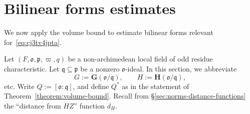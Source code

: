 \documentclass[reqno]{amsart}
\theoremstyle{plain} \newtheorem{theorem} {Theorem} \newtheorem{conjecture} {Conjecture} \newtheorem{corollary} [theorem] {Corollary} \newtheorem{proposition} [theorem] {Proposition} \newtheorem{fact} [theorem] {Fact}
\theoremstyle{definition} \newtheorem{definition} [theorem] {Definition}
\theoremstyle{itplain} %
\newcommand{\mfq}{\mathfrak{q}}
\begin{document}



\section{Bilinear forms estimates}\label{Sec:bilinear}
We now apply the volume bound to estimate bilinear forms relevant for~\eqref{eq:cj3tv4jpta}.

Let $(F,\mathfrak{o},\mathfrak{p},\varpi,q)$ be a non-archimedean local field of odd residue characteristic.  Let $\mfq \subseteq \mathfrak{p}$ be a nonzero $\mathfrak{o}$-ideal.
In this section, we abbreviate
\begin{equation*}
  G := \mathbf{G}(\mathfrak{o}/\mfq),
  \qquad
  H := \mathbf{H}(\mathfrak{o}/\mfq),
\end{equation*}
etc.  Write $Q := [\mathfrak{o}:\mfq]$, and define $Q^*$ as in the statement of Theorem~\ref{theorem:volume-bound}.  Recall from \S\ref{sec:norms-distance-functions} the ``distance from $H Z$'' function $d_H$.
\end{document}
